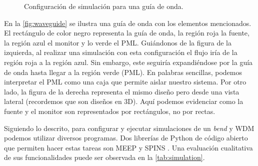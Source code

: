 \begin{figure}[ht]
  \centering
  \hfill

  \caption{Configuración de simulación para una guía de onda.}
  \label{fig:waveguide}
\end{figure}

En la \autoref{fig:waveguide} se ilustra una guía de onda con los elementos mencionados.
El rectángulo de color negro representa la guía de onda, la región roja la fuente, 
la región azul el monitor y lo verde el PML.
Guiándonos de la figura de la izquierda, al realizar una simulación con esta configuración 
el flujo iría de la región roja a la región azul.
Sin embargo, este seguiría expandiéndose por la guía de onda hasta llegar a la región verde (PML).
En palabras sencillas, podemos interpretar el PML como una caja que permite aislar nuestro sistema.
Por otro lado, la figura de la derecha representa el mismo diseño pero desde una vista lateral 
(recordemos que son diseños en 3D).
Aquí podemos evidenciar como la fuente y el monitor son representados por rectángulos, no por rectas.

Siguiendo lo descrito, para configurar y ejecutar simulaciones de un \emph{bend} y WDM podemos utilizar
diversos programas.
Dos librerías de Python de código abierto que permiten hacer estas tareas
son MEEP \citep{Oskooi2010} y SPINS \citep{Su2020}. 
Una evaluación cualitativa de sus funcionalidades puede ser observada en la \autoref{tab:simulation}.

